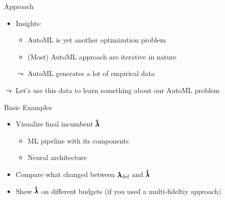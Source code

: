 \begin{frame}[c]{Approach}


\begin{itemize}
	\item \alert{Insights:}
	\begin{itemize}
		\item AutoML is yet another optimization problem
		\item (Most) AutoML approach are iterative in nature 
    \end{itemize}
	\item[$\leadsto$] AutoML generates a lot of empirical data 
\end{itemize}

\begin{center}
\scalebox{0.9}{
	
}
\end{center}

{$\leadsto$ Let's use this data to learn something about our AutoML problem}

\end{frame}
\begin{frame}[c]{Basic Examples}

\begin{itemize}
	\item Visualize final incumbent $\pmb{\hat{\lambda}}$
	\begin{itemize}
		\item ML pipeline with its components
		\item Neural architecture
	\end{itemize}
	\medskip
	\pause
	\item Compare what changed between ${\pmb{\lambda}}_{\text{def}}$ and $\pmb{\hat{\lambda}}$
	\medskip
	\pause		
	\item Show $\pmb{\hat{\lambda}}$ on different budgets (if you used a multi-fideltiy approach)
\end{itemize}

\end{frame}
